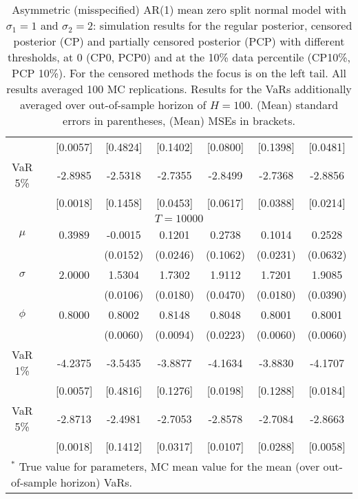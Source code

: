 {{\begin{table}
\begin{tabular}{cc cccccc}
  && [0.0057] & [0.4824] & [0.1402] & [0.0800] & [0.1398] & [0.0481] \\ 
\rowcolor{LightCyan} VaR 5\% && -2.8985 & -2.5318 & -2.7355 & -2.8499 & -2.7368 & -2.8856 \\ 
 && [0.0018] & [0.1458] & [0.0453] & [0.0617] & [0.0388] & [0.0214] \\ 
\hline 
\multicolumn{8}{c}{$T =10000$}  \\ 
\hline 
\rowcolor{LightCyan} $\mu$&& 0.3989 & -0.0015 & 0.1201 & 0.2738 & 0.1014 & 0.2528 \\ 
&&   & (0.0152) & (0.0246) & (0.1062) & (0.0231) & (0.0632) \\ 
\rowcolor{LightCyan} $\sigma$&& 2.0000 & 1.5304 & 1.7302 & 1.9112 & 1.7201 & 1.9085 \\ 
&&   & (0.0106) & (0.0180) & (0.0470) & (0.0180) & (0.0390) \\ 
\rowcolor{LightCyan} $\phi$&& 0.8000 & 0.8002 & 0.8148 & 0.8048 & 0.8001 & 0.8001 \\ 
&&   & (0.0060) & (0.0094) & (0.0223) & (0.0060) & (0.0060) \\ 
\rowcolor{LightCyan} VaR 1\% && -4.2375 & -3.5435 & -3.8877 & -4.1634 & -3.8830 & -4.1707 \\ 
  && [0.0057] & [0.4816] & [0.1276] & [0.0198] & [0.1288] & [0.0184] \\ 
\rowcolor{LightCyan} VaR 5\% && -2.8713 & -2.4981 & -2.7053 & -2.8578 & -2.7084 & -2.8663 \\ 
 && [0.0018] & [0.1412] & [0.0317] & [0.0107] & [0.0288] & [0.0058] \\ 
\hline 
\multicolumn{8}{l}{\footnotesize{$^*$ True value for parameters, MC mean value for the mean (over out-of-sample horizon) VaRs.}}  \\ 
\end{tabular}
 \caption{Asymmetric (misspecified) AR(1) mean zero split normal model with $\sigma_{1}=1$ and $\sigma_{2}=2$: simulation results   for the regular posterior, censored posterior (CP) and partially censored posterior (PCP) with different thresholds, at $0$ (CP0, PCP0) and at the 10\% data percentile (CP10\%, PCP 10\%). For the censored methods the focus is on the left tail. All results averaged 100 MC replications. Results for the VaRs additionally averaged over out-of-sample horizon of $H=100$. (Mean) standard errors in parentheses, (Mean) MSEs in brackets.} 
\label{tab:ar1_pcp_s2}  
\end{table}
}
}